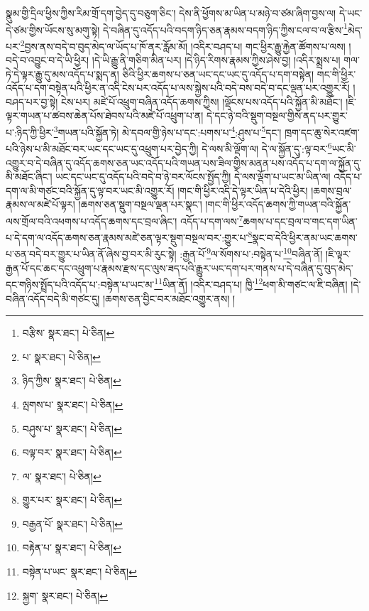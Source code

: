 སྣུམ་གྱི་དྲིལ་ཕྱིས་ཀྱིས་རིམ་གྲོ་དག་བྱེད་དུ་བཅུག་ཅིང་། དེས་ནི་ཕྱོགས་མ་ཡིན་པ་མཉེ་བ་ཙམ་ཞིག་བྱས་ལ། དེ་ཡང་དེ་ཙམ་གྱིས་ཡོངས་སུ་མགུ་སྟེ། དེ་བཞིན་དུ་འདོད་པའི་བདག་ཉིད་ཅན་རྣམས་བདག་ཉིད་ཀྱིས་ངལ་བ་ལ་རྩིས་\footnote{བརྩིས་  སྣར་ཐང་།  པེ་ཅིན། }མེད་པར་\footnote{པ་  སྣར་ཐང་།  པེ་ཅིན། }བྱས་ནས་བདེ་བ་བུད་མེད་ལ་ཡོད་པ་ཁོ་ནར་རློམ་མོ། །འདིར་བཤད་པ། གང་ཕྱིར་རྒྱུ་རྐྱེན་ཚོགས་པ་ལས། །བདེ་བ་འབྱུང་བ་དེ་ཡི་ཕྱིར། །དེ་ཡི་རྒྱུ་ནི་གཅིག་མིན་པར། །དེ་ཉིད་རིགས་རྣམས་ཀྱིས་ཤེས་བྱ། །འདིར་སྨྲས་པ། གལ་ཏེ་དེ་ལྟར་རྒྱུ་དུ་མས་འདོད་པ་སྨད་ན། ཅིའི་ཕྱིར་ཆགས་པ་ཅན་ཡང་དང་ཡང་དུ་འདོད་པ་དག་བསྟེན། གང་གི་ཕྱིར་འདོད་པ་དག་བསྟེན་པའི་ཕྱིར་ན་འདི་ངེས་པར་འདོད་པ་ལས་སྐྱེས་པའི་བདེ་བས་བདེ་བ་དང་ལྡན་པར་འགྱུར་རོ། །བཤད་པར་བྱ་སྟེ། ངེས་པར། མཛེ་པོ་འཕྲུག་བཞིན་འདོད་ཆགས་ཀྱིས། །ལྡོངས་པས་འདོད་པའི་སྐྱོན་མི་མཐོང་། །ཇི་ལྟར་གཡན་པ་ཚབས་ཆེན་པོས་ཐེབས་པའི་མཛེ་པོ་འཕྲུག་པ་ན། དེ་དང་ཉེ་བའི་སྡུག་བསྔལ་གྱིས་ནད་པར་གྱུར་པ་:ཉིད་ཀྱི་ཕྱིར་\footnote{ཉིད་ཀྱིས་  སྣར་ཐང་།  པེ་ཅིན། }གཡན་པའི་སྐྱོན་ཏེ། མེ་དབལ་གྱི་ཉེས་པ་དང་:པགས་པ་\footnote{ལྤགས་པ་  སྣར་ཐང་།  པེ་ཅིན། }:ཤུས་པ་\footnote{བཤུས་པ་  སྣར་ཐང་།  པེ་ཅིན། }དང་། ཁྲག་དང་ཆུ་སེར་འཛག་པའི་ཉེས་པ་མི་མཐོང་བར་ཡང་དང་ཡང་དུ་འཕྲུག་པར་བྱེད་ཀྱི། དེ་ལས་མི་ལྡོག་ལ། དེ་ལ་སྐྱོན་དུ་:ལྟ་བར་\footnote{བལྟ་བར་  སྣར་ཐང་།  པེ་ཅིན། }ཡང་མི་འགྱུར་བ་དེ་བཞིན་དུ་འདོད་ཆགས་ཅན་ཡང་འདོད་པའི་གཡན་པས་ཟིལ་གྱིས་མནན་པས་འདོད་པ་དག་ལ་སྐྱོན་དུ་མི་མཐོང་ཞིང་། ཡང་དང་ཡང་དུ་འདོད་པའི་བདེ་བ་ཉེ་བར་ལོངས་སྤྱོད་ཀྱི། དེ་ལས་ལྡོག་པ་ཡང་མ་ཡིན་ལ། འདོད་པ་དག་ལ་མི་གཙང་བའི་སྐྱོན་དུ་ལྟ་བར་ཡང་མི་འགྱུར་རོ། །གང་གི་ཕྱིར་འདི་དེ་ལྟར་ཡིན་པ་དེའི་ཕྱིར། །ཆགས་བྲལ་རྣམས་ལ་མཛེ་པོ་ལྟར། །ཆགས་ཅན་སྡུག་བསྔལ་ལྡན་པར་སྣང་། །གང་གི་ཕྱིར་འདོད་ཆགས་ཀྱི་གཡན་བའི་སྐྱོན་ལས་གྲོལ་བའི་འཕགས་པ་འདོད་ཆགས་དང་བྲལ་ཞིང་། འདོད་པ་དག་ལས་\footnote{ལ་  སྣར་ཐང་།  པེ་ཅིན། }ཆགས་པ་དང་བྲལ་བ་གང་དག་ཡིན་པ་དེ་དག་ལ་འདོད་ཆགས་ཅན་རྣམས་མཛེ་ཅན་ལྟར་སྡུག་བསྔལ་བར་:གྱུར་པ་\footnote{གྱུར་པར་  སྣར་ཐང་།  པེ་ཅིན། }སྣང་བ་དེའི་ཕྱིར་ནམ་ཡང་ཆགས་པ་ཅན་བདེ་བར་གྱུར་པ་ཡིན་ནོ་ཞེས་བྱ་བར་མི་རུང་སྟེ། :རྒྱན་པོ་\footnote{བརྒྱན་པོ་  སྣར་ཐང་།  པེ་ཅིན། }ལ་སོགས་པ་:བསྟེན་པ་\footnote{བརྟེན་པ་  སྣར་ཐང་།  པེ་ཅིན། }བཞིན་ནོ། །ཇི་ལྟར་རྒྱན་པོ་དང་ཆང་དང་འཕྲུག་པ་རྣམས་རྫས་དང་ལུས་ཟད་པའི་རྒྱུར་ཡང་དག་པར་གནས་པ་དེ་བཞིན་དུ་བུད་མེད་དང་གཉིས་སྤྲོད་པའི་འདོད་པ་:བསྟེན་པ་ཡང་མ་\footnote{བསྟེན་པ་ཡང་  སྣར་ཐང་།  པེ་ཅིན། }ཡིན་ནོ། །འདིར་བཤད་པ། ཁྱི་\footnote{སྐྱག་  སྣར་ཐང་།  པེ་ཅིན། }ཕག་མི་གཙང་ལ་ཇི་བཞིན། །དེ་བཞིན་འདོད་བདེ་མི་གཙང་དུ། །ཆགས་ཅན་བྱིང་བར་མཐོང་འགྱུར་ནས། །
